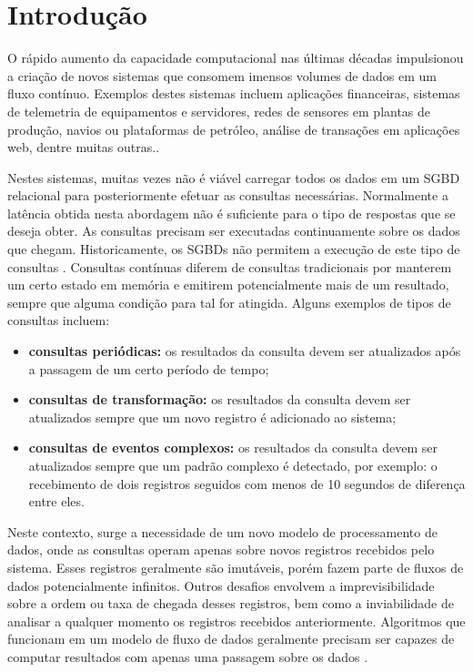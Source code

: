 \chapter{Introdução}

O rápido aumento da capacidade computacional nas últimas décadas impulsionou a criação de novos sistemas que consomem imensos volumes de dados em um fluxo contínuo. Exemplos destes sistemas incluem aplicações financeiras, sistemas de telemetria de equipamentos e servidores, redes de sensores em plantas de produção, navios ou plataformas de petróleo, análise de transações em aplicações web, dentre muitas outras..

Nestes sistemas, muitas vezes não é viável carregar todos os dados em um SGBD relacional para posteriormente efetuar as consultas necessárias. Normalmente a latência obtida nesta abordagem não é suficiente para o tipo de respostas que se deseja obter. As consultas precisam ser executadas continuamente sobre os dados que chegam. Historicamente, os SGBDs não permitem a execução de este tipo de consultas \cite{terry1992continuous}. Consultas contínuas diferem de consultas tradicionais por manterem um certo estado em memória e emitirem potencialmente mais de um resultado, sempre que alguma condição para tal for atingida. Alguns exemplos de tipos de consultas incluem:

\begin{itemize}
  \item \textbf{consultas periódicas:} os resultados da consulta devem ser atualizados após a passagem de um certo período de tempo;
  \item \textbf{consultas de transformação:} os resultados da consulta devem ser atualizados sempre que um novo registro é adicionado ao sistema;
  \item \textbf{consultas de eventos complexos:} os resultados da consulta devem ser atualizados sempre que um padrão complexo é detectado, por exemplo: o recebimento de dois registros seguidos com menos de 10 segundos de diferença entre eles.
\end{itemize}

Neste contexto, surge a necessidade de um novo modelo de processamento de dados, onde as consultas operam apenas sobre novos registros recebidos pelo sistema. Esses registros geralmente são imutáveis, porém fazem parte de fluxos de dados potencialmente infinitos. Outros desafios envolvem a imprevisibilidade sobre a ordem ou taxa de chegada desses registros, bem como a inviabilidade de analisar a qualquer momento os registros recebidos anteriormente. Algoritmos que funcionam em um modelo de fluxo de dados geralmente precisam ser capazes de computar resultados com apenas uma passagem sobre os dados \cite{babcock2002models}.


